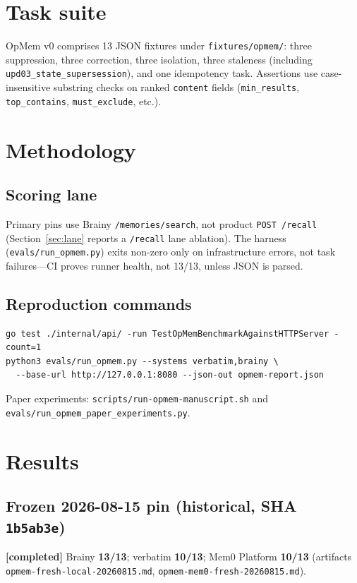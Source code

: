 \documentclass[11pt]{article}
\newcommand{\evidence}[2]{\textbf{[#1]} #2}
\begin{document}
\section{Task suite}
OpMem v0 comprises 13 JSON fixtures under \texttt{fixtures/opmem/}: three suppression,
three correction, three isolation, three staleness (including \texttt{upd03\_state\_supersession}),
and one idempotency task.
Assertions use case-insensitive substring checks on ranked \texttt{content} fields
(\texttt{min\_results}, \texttt{top\_contains}, \texttt{must\_exclude}, etc.).

\section{Methodology}
\subsection{Scoring lane}
Primary pins use Brainy \texttt{/memories/search}, not product \texttt{POST /recall}
(Section~\ref{sec:lane} reports a \texttt{/recall} lane ablation).
The harness (\texttt{evals/run\_opmem.py}) exits non-zero only on infrastructure errors,
not task failures---CI proves runner health, not 13/13, unless JSON is parsed.

\subsection{Reproduction commands}
\begin{lstlisting}[basicstyle=\ttfamily\small]
go test ./internal/api/ -run TestOpMemBenchmarkAgainstHTTPServer -count=1
python3 evals/run_opmem.py --systems verbatim,brainy \
  --base-url http://127.0.0.1:8080 --json-out opmem-report.json
\end{lstlisting}
Paper experiments: \texttt{scripts/run-opmem-manuscript.sh} and
\texttt{evals/run\_opmem\_paper\_experiments.py}.

\section{Results}
\label{sec:results}

\subsection{Frozen 2026-08-15 pin (historical, SHA \texttt{1b5ab3e})}
\evidence{completed}{
Brainy \textbf{13/13}; verbatim \textbf{10/13}; Mem0 Platform \textbf{10/13}
(artifacts \texttt{opmem-fresh-local-20260815.md}, \texttt{opmem-mem0-fresh-20260815.md}).
}
\end{document}
